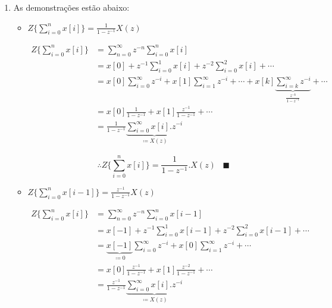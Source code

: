 \documentclass[twoside, fleqn]{article}
\begin{document}
    \begin{enumerate}
        \item %
        
        As demonstrações estão abaixo:
        
            \begin{itemize}
            	\item $Z\{\sum_{i=0}^{n}x[i] \} = \frac{1}{1-z^{-1}}X(z)$
            	
            	\begin{equation}
            	\begin{split}
            	Z\{\sum_{i=0}^{n}x[i] \} & = \sum_{n=0}^{\infty} z^{-n} \sum_{i=0}^{n} x[i] \\
            	& = x[0] + z^{-1} \sum_{i=0}^{1} x[i] + z^{-2} \sum_{i=0}^{2} x[i] + \cdots \\
            	& = x[0] \sum_{i=0}^{\infty} z^{-i} + x[1] \sum_{i=1}^{\infty} z^{-i} + \cdots + x[k] 
            	\underbrace{\sum_{i=k}^{\infty} z^{-i}}_{\frac{z^{-k}}{1 - z^{-1}}} + \cdots\\
            	& = x[0] \frac{1}{1 - z^{-1}} + x[1] \frac{z^{-1}}{1 - z^{-1}} + \cdots \\
            	& = \frac{1}{1 - z^{-1}} \underbrace{\sum_{i=0}^{\infty} x[i].z^{-i}}_{\coloneqq X(z)}
            	\end{split}
            	\end{equation}
            
            	\begin{equation}
            	\therefore Z\{\sum_{i=0}^{n}x[i] \} = \frac{1}{1-z^{-1}}.X(z) \hspace{10pt} \blacksquare
            	\end{equation}
            	
            	\item $Z\{\sum_{i=0}^{n}x[i-1] \} = \frac{z^{-1}}{1-z^{-1}}X(z)$
            
            	\begin{equation}
            	\begin{split}
            	Z\{\sum_{i=0}^{n}x[i] \} & = \sum_{n=0}^{\infty} z^{-n} \sum_{i=0}^{n} x[i-1] \\
            	& = x[-1] + z^{-1} \sum_{i=0}^{1} x[i-1] + z^{-2} \sum_{i=0}^{2} x[i-1] + \cdots \\
            	& = \underbrace{x[-1]}_{\coloneqq 0} \sum_{i=0}^{\infty} z^{-i} + x[0] \sum_{i=1}^{\infty} z^{-i} + \cdots \\
            	& = x[0] \frac{z^{-1}}{1 - z^{-1}} + x[1] \frac{z^{-2}}{1 - z^{-1}} + \cdots \\
            	& = \frac{z^{-1}}{1 - z^{-1}} \underbrace{\sum_{i=0}^{\infty} x[i].z^{-i}}_{\coloneqq X(z)}
            	\end{split}
            	\end{equation}
            

\end{itemize}
\end{enumerate}
\end{document}
